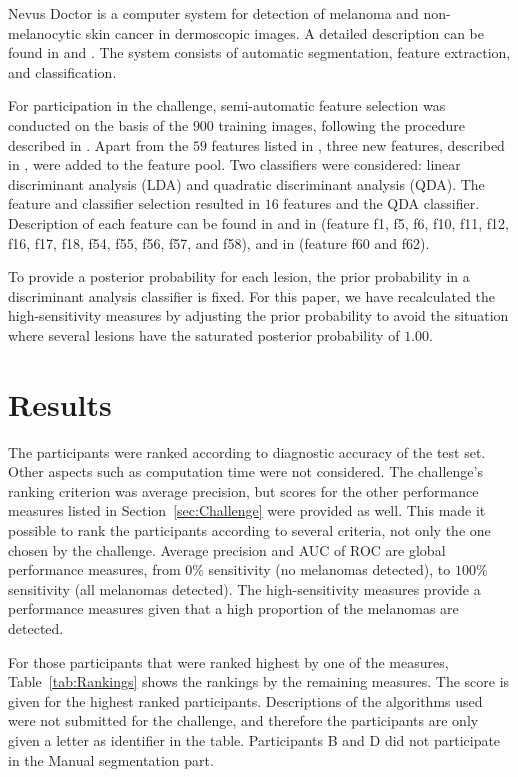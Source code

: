 \documentclass[a4paper,12pt]{article}
\begin{document}
Nevus Doctor is a computer system for detection of melanoma and non-melanocytic skin cancer in dermoscopic images. 
A detailed description can be found in \cite{Mollersen2015Improved} and \cite{Zortea2014Performance}. 
The system consists of automatic segmentation, feature extraction, and classification. 

For participation in the challenge, semi-automatic feature selection was conducted on the basis of the $900$ training images, following the procedure described in \cite{Mollersen2015Improved}. 
Apart from the $59$ features listed in \cite{Mollersen2015Improved}, three new features, described in \cite{Mollersen2015Divergencebased}, were added to the feature pool. 
Two classifiers were considered: linear discriminant analysis (LDA) and quadratic discriminant analysis (QDA). 
The feature and classifier selection resulted in $16$ features and the QDA classifier. 
Description of each feature can be found in \cite{Mollersen2015Improved} and in \cite{Zortea2014Performance} (feature f1, f5, f6, f10, f11, f12, f16, f17, f18, f54, f55, f56, f57, and f58), and in  \cite{Mollersen2015Divergencebased} (feature f60 and f62).

To provide a posterior probability for each lesion, the prior probability in a discriminant analysis classifier is fixed. 
For this paper, we have recalculated the high-sensitivity measures by adjusting the prior probability to avoid the situation where several lesions have the saturated posterior probability of $1.00$. 

\section{Results} \label{sec:Results}

The participants were ranked according to diagnostic accuracy of the test set. 
Other aspects such as computation time were not considered.
The challenge's ranking criterion was average precision, but scores for the other performance measures listed in Section~\ref{sec:Challenge} were provided as well.  
This made it possible to rank the participants according to several criteria, not only the one chosen by the challenge. 
Average precision and AUC of ROC are global performance measures, from $0\%$ sensitivity (no melanomas detected), to $100\%$ sensitivity (all melanomas detected). 
The high-sensitivity measures provide a performance measures given that a high proportion of the melanomas are detected. 

For those participants that were ranked highest by one of the measures, Table~\ref{tab:Rankings} shows the rankings
by the remaining measures. 
The score is given for the highest ranked participants. 
Descriptions of the algorithms used were not submitted for the challenge, and therefore the participants are only given a letter as identifier in the table. 
Participants B and D did not participate in the Manual segmentation part. 
\end{document}
